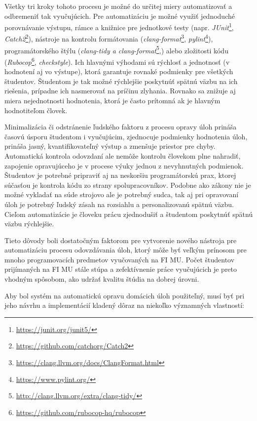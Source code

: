 \documentclass[
  digital, %
  oneside, %
  table,   %
  lof,     %
  lot,   %
]{fithesis3}
\begin{document}
Všetky tri kroky tohoto procesu je možné do určitej miery automatizovať a odbremeniť tak vyučujúcich. Pre automatizáciu je možné využiť jednoduché porovnávanie výstupu, rámce a knižnice pre jednotkové testy (napr. \emph{JUnit}\footnote{\url{https://junit.org/junit5/}}, \emph{Catch2}\footnote{\url{https://github.com/catchorg/Catch2}}), nástroje na kontrolu formátovania (\emph{clang-format}\footnote{\url{https://clang.llvm.org/docs/ClangFormat.html}}, \textit{pylint}\footnote{\url{https://www.pylint.org/}}), programátorského štýlu (\textit{clang-tidy a clang-format}\footnote{\url{http://clang.llvm.org/extra/clang-tidy/}},) alebo zložitosti kódu (\textit{Rubocop}\footnote{\url{https://github.com/rubocop-hq/rubocop}}, \textit{checkstyle}). Ich hlavnými výhodami sú rýchlosť a jednotnosť (v hodnotení aj vo výstupe), ktorá garantuje rovnaké podmienky pre všetkých študentov. Študentom je tak možné rýchlejšie poskytnúť spätnú väzbu na ich riešenia, prípadne ich nasmerovať na príčinu zlyhania. Rovnako sa znižuje aj miera nejednotnosti hodnotenia, ktorá je často prítomná ak je hlavným hodnotiteľom človek.

Minimalizácia či odstránenie ľudského faktoru z procesu opravy úloh prináša časovú úsporu študentom i vyučujúcim, zjednocuje podmienky hodnotenia úloh, prináša jasný, kvantifikovateľný výstup a zmenšuje priestor pre chyby. Automatická kontrola odovzdaní ale nemôže kontrolu človekom plne nahradiť, zapojenie opravujúceho je v procese výuky jednou z nevyhnutných podmienok. Študentov je potrebné pripraviť aj na neskoršiu programátorskú prax, ktorej súčasťou je kontrola kódu zo strany spolupracovníkov\cite{code_reviews_atlassian}. Podobne ako zákony nie je možné vykladať na súde strojovo ale je potrebný sudca, tak aj pri opravovaní úloh je potrebný ľudský zásah na rozsiahlu a personalizovanú spätnú väzbu\cite{code-feedback}. Cieľom automatizácie je človeku prácu zjednodušiť a študentom poskytnúť spätnú väzbu rýchlejšie.

Tieto dôvody boli dostatočným faktorom pre vytvorenie nového nástroja pre automatizáciu procesu odovzdávania úloh, ktorý môže byť veľkým prínosom pre mnoho programovacích predmetov vyučovaných na FI MU. Počet študentov prijímaných na FI MU stále stúpa a zefektívnenie práce vyučujúcich je preto vhodným spôsobom, ako udržať kvalitu štúdia na dobrej úrovni.

Aby bol systém na automatickú opravu domácich úloh použiteľný, musí byť pri jeho návrhu a implementácií kladený dôraz na niekoľko významných vlastností\cite{obrien-attributes-soa}:
\end{document}
